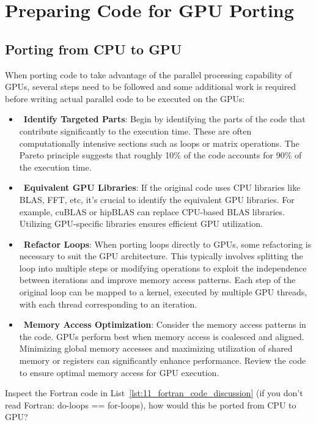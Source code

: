 \section{Preparing Code for GPU Porting}


\subsection{Porting from CPU to GPU}


\par
When porting code to take advantage of the parallel processing capability of GPUs, several steps need to be followed and some additional work is required before writing actual parallel code to be executed on the GPUs:
\begin{itemize}
    \item~\textbf{Identify Targeted Parts}: Begin by identifying the parts of the code that contribute significantly to the execution time. These are often computationally intensive sections such as loops or matrix operations. The Pareto principle suggests that roughly 10\% of the code accounts for 90\% of the execution time.
    \item~\textbf{Equivalent GPU Libraries}: If the original code uses CPU libraries like BLAS, FFT, etc, it’s crucial to identify the equivalent GPU libraries. For example, cuBLAS or hipBLAS can replace CPU-based BLAS libraries. Utilizing GPU-specific libraries ensures efficient GPU utilization.
    \item~\textbf{Refactor Loops}: When porting loops directly to GPUs, some refactoring is necessary to suit the GPU architecture. This typically involves splitting the loop into multiple steps or modifying operations to exploit the independence between iterations and improve memory access patterns. Each step of the original loop can be mapped to a kernel, executed by multiple GPU threads, with each thread corresponding to an iteration.
    \item~\textbf{Memory Access Optimization}: Consider the memory access patterns in the code. GPUs perform best when memory access is coalesced and aligned. Minimizing global memory accesses and maximizing utilization of shared memory or registers can significantly enhance performance. Review the code to ensure optimal memory access for GPU execution.
\end{itemize}


\par
Inspect the Fortran code in List~\ref{lst:11_fortran_code_discussion} (if you don’t read Fortran: do-loops == for-loops), how would this be ported from CPU to GPU?


